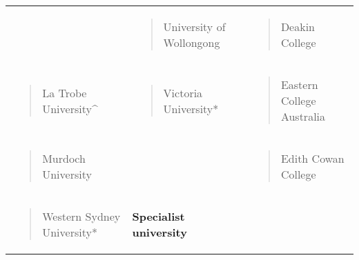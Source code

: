 \documentclass[]{book}
\begin{document}
\begin{longtable}[]{@{}lll@{}}
\begin{minipage}[t]{0.32\columnwidth}
\end{minipage} & \begin{minipage}[t]{0.32\columnwidth}\raggedright
\begin{quote}
University of Wollongong
\end{quote}\strut
\end{minipage} & \begin{minipage}[t]{0.32\columnwidth}\raggedright
\begin{quote}
Deakin College
\end{quote}\strut
\end{minipage}\tabularnewline
\begin{minipage}[t]{0.32\columnwidth}\raggedright
\begin{quote}
La Trobe University\^{}
\end{quote}\strut
\end{minipage} & \begin{minipage}[t]{0.32\columnwidth}\raggedright
\begin{quote}
Victoria University*
\end{quote}\strut
\end{minipage} & \begin{minipage}[t]{0.32\columnwidth}\raggedright
\begin{quote}
Eastern College Australia
\end{quote}\strut
\end{minipage}\tabularnewline
\begin{minipage}[t]{0.32\columnwidth}\raggedright
\begin{quote}
Murdoch University
\end{quote}\strut
\end{minipage} & \begin{minipage}[t]{0.32\columnwidth}\raggedright
\strut
\end{minipage} & \begin{minipage}[t]{0.32\columnwidth}\raggedright
\begin{quote}
Edith Cowan College
\end{quote}\strut
\end{minipage}\tabularnewline
\begin{minipage}[t]{0.32\columnwidth}\raggedright
\begin{quote}
Western Sydney University*
\end{quote}\strut
\end{minipage} & \begin{minipage}[t]{0.32\columnwidth}\raggedright
\textbf{Specialist university}\strut

\end{minipage}
\end{longtable}
\end{document}
